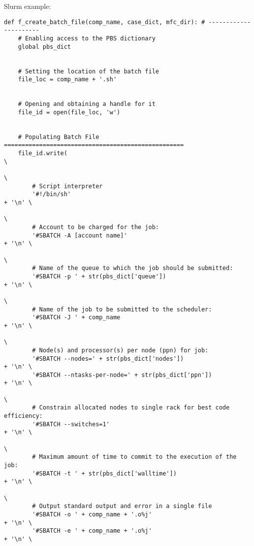 \documentclass[11pt]{article}
\begin{document}
Slurm example: \\
\begin{lstlisting}[style=BashInputStyle]
def f_create_batch_file(comp_name, case_dict, mfc_dir): # ----------------------
    # Enabling access to the PBS dictionary
    global pbs_dict
    
    
    # Setting the location of the batch file
    file_loc = comp_name + '.sh'
    
    
    # Opening and obtaining a handle for it
    file_id = open(file_loc, 'w')
    
    
    # Populating Batch File  ===================================================
    file_id.write(                                                             \
                                                                               \
        # Script interpreter
        '#!/bin/sh'                                                     + '\n' \
                                                                               \
        # Account to be charged for the job:
        '#SBATCH -A [account name]'                                     + '\n' \
                                                                               \
        # Name of the queue to which the job should be submitted:
        '#SBATCH -p ' + str(pbs_dict['queue'])                          + '\n' \
                                                                               \
        # Name of the job to be submitted to the scheduler:
        '#SBATCH -J ' + comp_name                                       + '\n' \
                                                                               \
        # Node(s) and processor(s) per node (ppn) for job:
        '#SBATCH --nodes=' + str(pbs_dict['nodes'])                     + '\n' \
        '#SBATCH --ntasks-per-node=' + str(pbs_dict['ppn'])             + '\n' \
                                                                               \
        # Constrain allocated nodes to single rack for best code efficiency:
        '#SBATCH --switches=1'                                          + '\n' \
                                                                               \
        # Maximum amount of time to commit to the execution of the job:
        '#SBATCH -t ' + str(pbs_dict['walltime'])                       + '\n' \
                                                                               \
        # Output standard output and error in a single file
        '#SBATCH -o ' + comp_name + '.o%j'                              + '\n' \
        '#SBATCH -e ' + comp_name + '.o%j'                              + '\n' \

\end{lstlisting}
\end{document}
